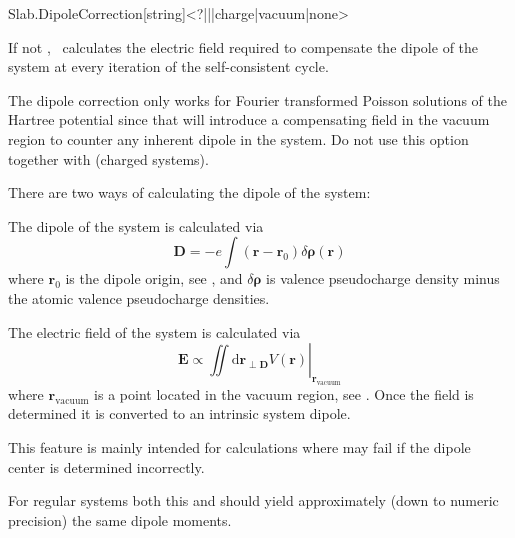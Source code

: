   \begin{fdfentry}{Slab.DipoleCorrection}[string]<?|\fdftrue|\fdffalse|charge|vacuum|none>
  
    If not \fdffalse, \siesta\ calculates the electric field required to
    compensate the dipole of the system at every iteration of the
    self-consistent cycle.
  
    The dipole correction only works for Fourier transformed Poisson
    solutions of the Hartree potential since that will introduce a
    compensating field in the vacuum region to counter any inherent
    dipole in the system. Do not use this option together with
     (charged systems).
  
    There are two ways of calculating the dipole of the system:
    \begin{fdfoptions}
  
  
      The dipole of the system is calculated via
      \begin{equation}
        \mathbf D = - e \int(\mathbf r - \mathbf r_0) \delta\boldsymbol\rho(\mathbf r)
      \end{equation}
      where $\mathbf r_0$ is the dipole origin, see ,
      and $\delta\boldsymbol\rho$ is valence pseudocharge density minus
      the atomic valence pseudocharge densities.
  
      \option[vacuum]%
  
      The electric field of the system is calculated via
      \begin{equation}
        \mathbf E \propto \left.\iint \mathrm d \mathbf r_{\perp \mathbf D} V(\mathbf
          r)\right|_{\mathbf r_{\mathrm{vacuum}}}
      \end{equation}
      where $\mathbf r_{\mathrm{vacuum}}$ is a point located in the
      vacuum region, see . Once the field is
      determined it is converted to an intrinsic system dipole.
  
      This feature is mainly intended for 
      calculations where  may fail if the dipole
      center is determined incorrectly.
  
      For regular systems both this and  should yield
      approximately (down to numeric precision) the same dipole moments.
  

\end{fdfoptions}
\end{fdfentry}
